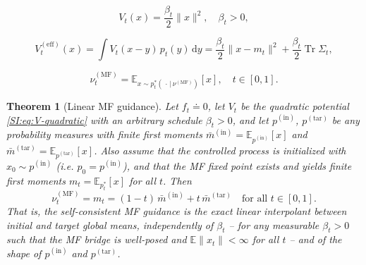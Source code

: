 \documentclass[10pt,a4paper]{amsart}
\newtheorem{theorem}{Theorem}
\newcommand{\MF}{\mathrm{MF}}
\newcommand{\Veff}{V^{(\mathrm{eff})}}
\newcommand{\dd}{\mathrm{d}}
\newcommand{\pin}{p^{(\mathrm{in})}}
\newcommand{\ptar}{p^{(\mathrm{tar})}}
\newcommand{\tr}{\operatorname{Tr}}
\begin{document}
\begin{equation}
  V_t(x) = \frac{\beta_t}{2}\|x\|^2, \quad \beta_t > 0,
  \label{SI:eq:V-quadratic}
\end{equation}

\begin{equation}
  \Veff_t(x) = \int V_t(x-y)\,p_t(y)\,\dd y= \frac{\beta_t}{2}\|x - m_t\|^2 + \frac{\beta_t}{2}\tr\Sigma_t,
  \label{SI:eq:Veff-quad}
\end{equation}

\begin{equation}
  \nu_t^{(\MF)}= \mathbb{E}_{x\sim p_t^{*}(\,\cdot\,|\,\nu^{(\MF)})}[x], \quad t\in[0,1].
  \label{SI:eq:self-consistency}
\end{equation}

\begin{theorem}[Linear MF guidance]
\label{thm:linear-guidance}
Let $f_t \doteq  0$, let $V_t$ be the quadratic potential \eqref{SI:eq:V-quadratic} with an arbitrary schedule $\beta_t > 0$, and let $\pin$, $\ptar$ be any probability measures with finite first moments $\bar m^{(\mathrm{in})} = \mathbb{E}_{\pin}[x]$ and $\bar m^{(\mathrm{tar})} = \mathbb{E}_{\ptar}[x]$. Also assume that the controlled process is initialized with $x_0\sim p^{(\mathrm{in})}$ (i.e. $p_0=p^{(\mathrm{in})}$), and that the MF fixed point exists and yields finite first moments  $m_t = \mathbb{E}_{p_t^*}[x]$ for all $t$. Then
\begin{equation}
  \nu_t^{(\MF)} = m_t
  = (1-t)\,\bar m^{(\mathrm{in})} + t\,\bar m^{(\mathrm{tar})}
  \quad \text{for all } t\in[0,1].
  \label{SI:eq:nu-linear}
\end{equation}
That is, the self-consistent MF guidance is the \emph{exact} linear interpolant between initial and target global means, independently of $\beta_t$ -- for any measurable $\beta_t>0$ such that the MF bridge is well-posed and $\mathbb E\|x_t\|<\infty$ for all $t$ -- and of the shape of $\pin$ and $\ptar$.
\end{theorem}
\end{document}
